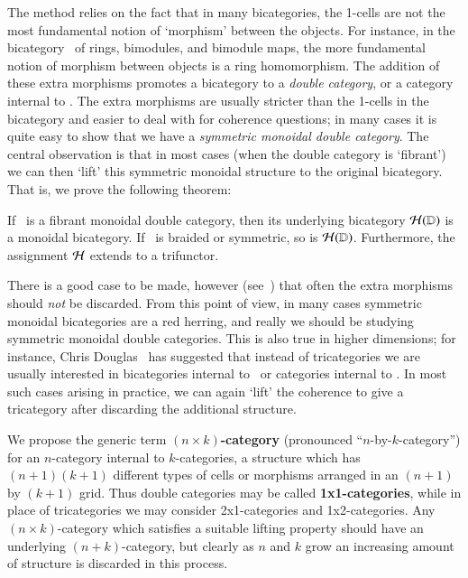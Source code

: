 \documentclass{amsart}
\begin{document}
The method relies on the fact that in many bicategories, the 1-cells
are not the most fundamental notion of `morphism' between the objects.
For instance, in the bicategory \cMod\ of rings, bimodules, and
bimodule maps, the more fundamental notion of morphism between objects
is a ring homomorphism. The addition of these extra morphisms promotes
a bicategory to a \emph{double category}, or a category internal to
\cCat.  The extra morphisms are usually stricter than the 1-cells in
the bicategory and easier to deal with for coherence questions; in
many cases it is quite easy to show that we have a \emph{symmetric
  monoidal double category}.  The central observation is that in most
cases (when the double category is `fibrant') we can then `lift' this
symmetric monoidal structure to the original bicategory.  That is, we
prove the following theorem:

\begin{thm}\label{thm:mondbl-monbi-intro}
  If \lD\ is a fibrant monoidal double category, then its underlying
  bicategory $\mathcal{H}(\mathbb{D})$ is a monoidal bicategory.  If \lD\ is braided
  or symmetric, so is $\mathcal{H}(\mathbb{D})$. Furthermore, the assignment $\mathcal{H}$ extends to a trifunctor.
\end{thm}

There is a good case to be made, however (see~\cite{shulman:frbi})
that often the extra morphisms should \emph{not} be discarded.  From
this point of view, in many cases symmetric monoidal bicategories are
a red herring, and really we should be studying symmetric monoidal
double categories.  This is also true in higher dimensions; for
instance, Chris Douglas~\cite{douglas:tfttalk} has suggested that
instead of tricategories we are usually interested in bicategories
internal to \cCat\ or categories internal to \cTwocat.  In most such
cases arising in practice, we can again `lift' the coherence to give a
tricategory after discarding the additional structure.

We propose the generic term \textbf{$(n\times k)$-category}
(pronounced ``$n$-by-$k$-category'') for an $n$-category internal to
$k$-categories, a structure which has $(n+1)(k+1)$ different types of
cells or morphisms arranged in an $(n+1)$ by $(k+1)$ grid.  Thus
double categories may be called \textbf{1x1-categories}, while in
place of tricategories we may consider 2x1-categories and
1x2-categories.  Any $(n\times k)$-category which satisfies a suitable
lifting property should have an underlying $(n+k)$-category, but
clearly as $n$ and $k$ grow an increasing amount of structure is
discarded in this process.
\end{document}
